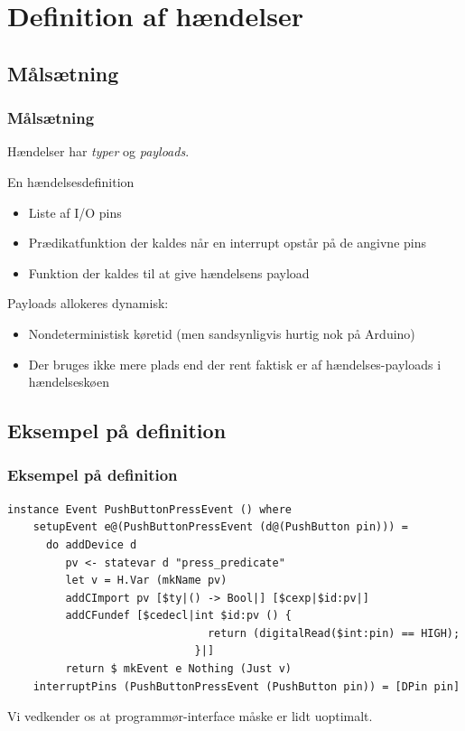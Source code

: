 \documentclass{beamer}
\begin{document}
\section{Definition af hændelser}
\subsection{Målsætning}
\begin{frame}
\frametitle{Målsætning}

Hændelser har \textit{typer} og \textit{payloads}.

\begin{block}{En hændelsesdefinition}
\begin{itemize} 
\item Liste af I/O pins
\item Prædikatfunktion der kaldes når en interrupt opstår på de
  angivne pins
\item Funktion der kaldes til at give hændelsens payload
\end{itemize}
\end{block}

Payloads allokeres dynamisk:

\begin{itemize}
\item Nondeterministisk køretid (men sandsynligvis hurtig nok på
  Arduino)
\item Der bruges ikke mere plads end der rent faktisk er af
  hændelses-payloads i hændelseskøen
\end{itemize}

\end{frame}

\subsection{Eksempel på definition}
\begin{frame}[fragile]
\frametitle{Eksempel på definition}

\tiny
\begin{verbatim}
instance Event PushButtonPressEvent () where
    setupEvent e@(PushButtonPressEvent (d@(PushButton pin))) = 
      do addDevice d
         pv <- statevar d "press_predicate" 
         let v = H.Var (mkName pv)
         addCImport pv [$ty|() -> Bool|] [$cexp|$id:pv|]
         addCFundef [$cedecl|int $id:pv () {
                               return (digitalRead($int:pin) == HIGH);
                             }|]
         return $ mkEvent e Nothing (Just v)
    interruptPins (PushButtonPressEvent (PushButton pin)) = [DPin pin]
\end{verbatim}
\normalsize

\pause

Vi vedkender os at programmør-interface måske er lidt uoptimalt.

\end{frame}
\end{document}
